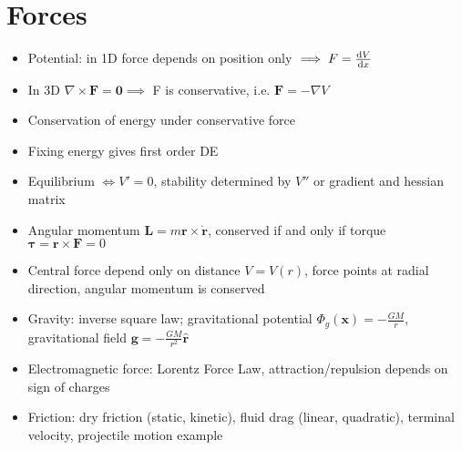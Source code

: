 \section{Forces}
\begin{itemize}
      \item Potential: in 1D force depends on position only $\implies F = \frac{\mathrm{d}{V}}{\mathrm{d}{x}}$
      \item In 3D $\nabla \times \mathbf{F} = \mathbf{0} \implies $ F is conservative, i.e. $ \mathbf{F} = -\nabla V$
      \item Conservation of energy under conservative force
      \item Fixing energy gives first order DE
      \item Equilibrium $\iff V' = 0$, stability determined by $V''$ or gradient and hessian matrix
      \item Angular momentum $\mathbf{L} = m \mathbf{r} \times \mathbf{\dot{r}} $, conserved if and only if torque $\mathbf{\tau} = \mathbf{r} \times \mathbf{F} = 0$
      \item Central force depend only on distance $V = V(r)$, force points at radial direction, angular momentum is conserved
      \item Gravity: inverse square law; gravitational potential $\Phi_g(\mathbf{x}) = -\frac{GM}{r}$, gravitational field $\mathbf{g} = -\frac{GM}{r^2} \mathbf{\hat{r}}$
      \item Electromagnetic force: Lorentz Force Law, attraction/repulsion depends on sign of charges
      \item Friction: dry friction (static, kinetic), fluid drag (linear, quadratic), terminal velocity, projectile motion example
\end{itemize}

